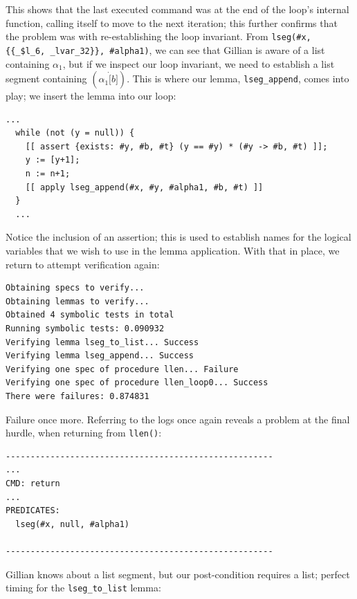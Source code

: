 This shows that the last executed command was at the end of the loop's internal
function, calling itself to move to the next iteration; this further confirms
that the problem was with re-establishing the loop invariant. From
\texttt{lseg(\#x, \{\{\_\$l\_6, \_lvar\_32\}\}, \#alpha1)}, we can see that Gillian
is aware of a list containing $\alpha_1$, but if we inspect our loop invariant,
we need to establish a list segment containing $(\alpha_1 \dot [b])$. This is
where our lemma, \texttt{lseg\_append}, comes into play; we insert the lemma
into our loop:
\begin{lstlisting}[style=code, numbers=none, caption={Applying \texttt{lseg\_append}}]
  ...
  while (not (y = null)) {
    [[ assert {exists: #y, #b, #t} (y == #y) * (#y -> #b, #t) ]];
    y := [y+1];
    n := n+1;
    [[ apply lseg_append(#x, #y, #alpha1, #b, #t) ]]
  }
  ...
\end{lstlisting}

Notice the inclusion of an assertion; this is used to establish names for the
logical variables that we wish to use in the lemma application. With that in
place, we return to attempt verification again:

\begin{lstlisting}[style=code, numbers=none, caption={WISL list length - list / list segment error}]
Obtaining specs to verify...
Obtaining lemmas to verify...
Obtained 4 symbolic tests in total
Running symbolic tests: 0.090932
Verifying lemma lseg_to_list... Success
Verifying lemma lseg_append... Success
Verifying one spec of procedure llen... Failure
Verifying one spec of procedure llen_loop0... Success
There were failures: 0.874831
\end{lstlisting}

Failure once more. Referring to the logs once again reveals a problem at the
final hurdle, when returning from \texttt{llen()}:

\begin{lstlisting}[numbers=none, style=code, caption={WISL list length - list / list segment error, Gillian log file}]
------------------------------------------------------
...
CMD: return
...
PREDICATES:
  lseg(#x, null, #alpha1)

------------------------------------------------------
\end{lstlisting}

Gillian knows about a list segment, but our post-condition requires a list;
perfect timing for the \texttt{lseg\_to\_list} lemma:

